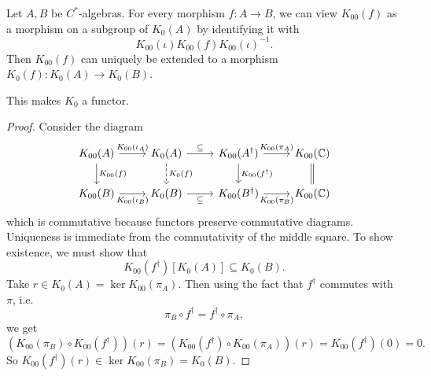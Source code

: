 \begin{lemma}
Let $A,B$ be $C^*$-algebras. For every morphism $f: A\to B$, we can view $K_{00}(f)$ as a morphism on a subgroup of $K_0(A)$ by identifying it with
\[ K_{00}(\iota)K_{00}(f)K_{00}(\iota)^{-1}. \]
Then $K_{00}(f)$ can uniquely be extended to a morphism $K_0(f): K_0(A)\to K_0(B)$. 

This makes $K_0$ a functor.
\end{lemma}
\begin{proof}
Consider the diagram
\[ \begin{tikzcd}
K_{00}(A) \rar{K_{00}(\iota_A)} \dar{K_{00}(f)} & K_0(A) \rar{\subseteq}\dar[dashed]{K_0(f)} & K_{00}(A^\dagger) \rar{K_{00}(\pi_A)}\dar{K_{00}(f^\dagger)} & K_{00}(\C) \ar[d, equals] \\
K_{00}(B) \rar[swap]{K_{00}(\iota_B)} & K_0(B) \rar[swap]{\subseteq} & K_{00}(B^\dagger) \rar[swap]{K_{00}(\pi_B)} & K_{00}(\C)
\end{tikzcd} \]
which is commutative because functors preserve commutative diagrams. Uniqueness is immediate from the commutativity of the middle square. To show existence, we must show that
\[ K_{00}(f^\dagger)[K_0(A)] \subseteq K_0(B). \]
Take $r \in K_0(A) = \ker K_{00}(\pi_A)$. Then using the fact that $f^\dagger$ commutes with $\pi$, i.e.\ 
\[ \pi_B \circ f^\dagger = f^\dagger\circ \pi_A,\]
we get 
\[ (K_{00}(\pi_B)\circ K_{00}(f^\dagger))(r) = (K_{00}(f^\dagger)\circ K_{00}(\pi_A))(r) = K_{00}(f^\dagger)(0) = 0. \]
So $K_{00}(f^\dagger)(r) \in \ker K_{00}(\pi_B) = K_0(B)$.
\end{proof}


